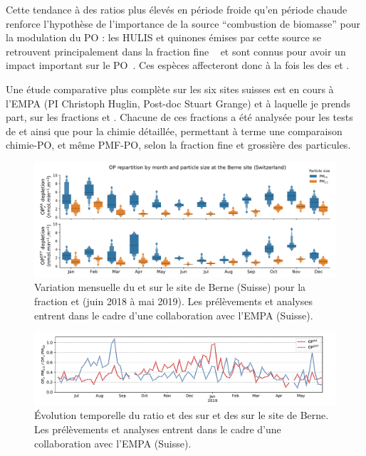 Cette tendance à des ratios plus élevés en période froide qu'en période chaude renforce
l'hypothèse de l'importance de la source ``combustion de biomasse'' pour la modulation du
PO : les HULIS et quinones émises par cette source se retrouvent principalement dans la
fraction fine \PMdc{}~\autocite{linAbundance2010,fangOxidative2019} et sont connus pour
avoir un impact important sur le PO~\autocite{vermaFractionating2015,maSources2018}.
Ces espèces affecteront donc à la fois les \POv{} des \PMdc{} et \PMdix.

Une étude comparative plus complète sur les six sites suisses est en cours à l'EMPA (PI
Christoph Huglin, Post-doc Stuart Grange) et à laquelle je prends part, sur les fractions
\PMdix{} et \PMdc. Chacune de ces fractions a été analysée pour les tests de \POAA{} et
\PODTT{} ainsi que pour la chimie détaillée, permettant à terme une comparaison
chimie-PO, et même PMF-PO, selon la fraction fine et grossière des particules.

\begin{figure}[ht]
    \centering
    \includegraphics[width=1.0\linewidth]{figures/chapter04/PO_berne.pdf}
    \caption{Variation mensuelle du \POAAv{} et \PODTTv{} sur le site de Berne (Suisse)
    pour la fraction \PMdix{} et \PMdc{} (juin 2018 à mai 2019).  Les prélèvements et
analyses entrent dans le cadre d'une collaboration avec l'EMPA (Suisse).}%
    \label{fig:PO_berne}
\end{figure}

\begin{figure}[ht]
    \centering
    \includegraphics[width=1\linewidth]{figures/chapter04/PO_berne_ratio_PM10_PM25.pdf}
    \caption{Évolution temporelle du ratio \POAAv{} et \PODTTv{} des \PMdix{} sur \POAAv{}
    et \PODTTv{} des \PMdc{} sur le site de Berne. Les prélèvements et
analyses entrent dans le cadre d'une collaboration avec l'EMPA (Suisse).}%
    \label{fig:PO_berne_ratio_PM10_PM25}
\end{figure}

